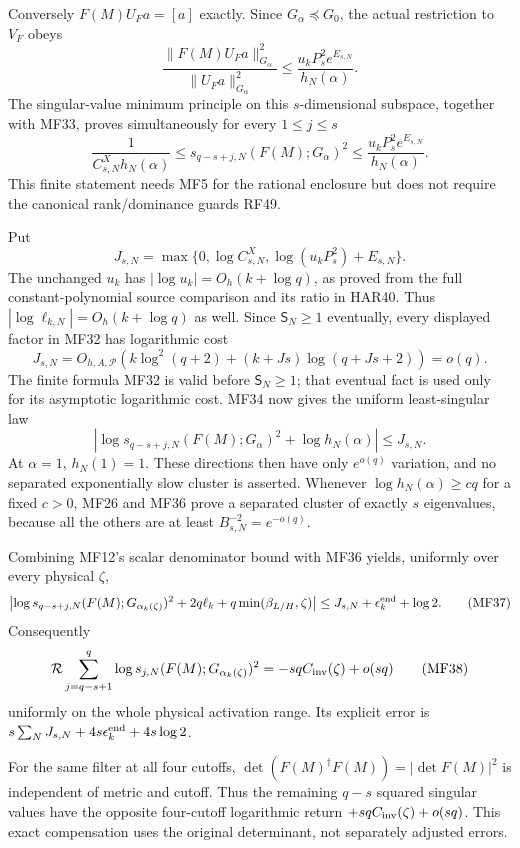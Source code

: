 \documentclass[11pt]{article}
\begin{document}
Conversely \(F(M)U_Fa=[a]\) exactly. Since \(G_\alpha\preceq G_0\), the actual restriction to \(V_F\) obeys \[
\frac{\|F(M)U_Fa\|_{G_\alpha}^2}{\|U_Fa\|_{G_\alpha}^2}
\le\frac{u_kP_s^2e^{E_{s,N}}}{h_N(\alpha)} .
\] The singular-value minimum principle on this \(s\)-dimensional subspace, together with MF33, proves simultaneously for every \(1\le j\le s\) \[
\boxed{
\frac1{C_{s,N}^{X}h_N(\alpha)}
\le s_{q-s+j,N}(F(M);G_\alpha)^2
\le\frac{u_kP_s^2e^{E_{s,N}}}{h_N(\alpha)}.}
\tag{MF34}
\] This finite statement needs MF5 for the rational enclosure but does not require the canonical rank/dominance guards RF49.

Put \[
J_{s,N}=\max\{0,\log C_{s,N}^{X},\log(u_kP_s^2)+E_{s,N}\}.
\] The unchanged \(u_k\) has \(|\log u_k|=O_h(k+\log q)\), as proved from the full constant-polynomial source comparison and its ratio in HAR40. Thus \(|\log\ell_{k,N}|=O_h(k+\log q)\) as well. Since \(\mathsf S_N\ge1\) eventually, every displayed factor in MF32 has logarithmic cost \[
J_{s,N}=O_{h,A,\mathscr P}
\left(k\log^2(q+2)+(k+Js)\log(q+Js+2)\right)=o(q).
\tag{MF35}
\] The finite formula MF32 is valid before \(\mathsf S_N\ge1\); that eventual fact is used only for its asymptotic logarithmic cost. MF34 now gives the uniform least-singular law \[
\left|\log s_{q-s+j,N}(F(M);G_\alpha)^2+\log h_N(\alpha)\right|
\le J_{s,N}.
\tag{MF36}
\] At \(\alpha=1\), \(h_N(1)=1\). These directions then have only \(e^{o(q)}\) variation, and no separated exponentially slow cluster is asserted. Whenever \(\log h_N(\alpha)\ge cq\) for a fixed \(c>0\), MF26 and MF36 prove a separated cluster of exactly \(s\) eigenvalues, because all the others are at least \(B_{s,N}^{-2}=e^{-o(q)}\).

Combining MF12's scalar denominator bound with MF36 yields, uniformly over every physical \(\zeta\), \[
\left|
\log s_{q-s+j,N}(F(M);G_{\alpha_k(\zeta)})^2
+2q\ell_k+q\min(\beta_{L/H},\zeta)
\right|
\le J_{s,N}+\epsilon_k^{\rm end}+\log2 .
\tag{MF37}
\] Consequently \[
\mathcal R\sum_{j=q-s+1}^{q}
\log s_{j,N}(F(M);G_{\alpha_k(\zeta)})^2
=-sq C_{\rm inv}(\zeta)+o(sq)
\tag{MF38}
\] uniformly on the whole physical activation range. Its explicit error is \(s\sum_NJ_{s,N}+4s\epsilon_k^{\rm end}+4s\log2\).

For the same filter at all four cutoffs, \(\det(F(M)^\dagger F(M))=|\det F(M)|^2\) is independent of metric and cutoff. Thus the remaining \(q-s\) squared singular values have the opposite four-cutoff logarithmic return \(+sq C_{\rm inv}(\zeta)+o(sq)\). This exact compensation uses the original determinant, not separately adjusted errors.
\end{document}
